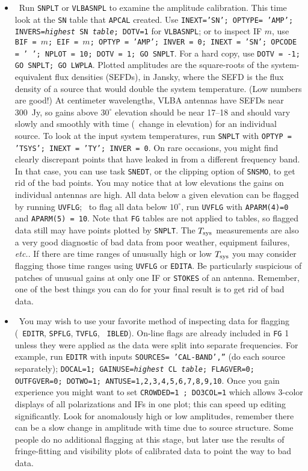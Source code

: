 \begin{enumerate}
\begin{itemize}
\item\ {Run {\tt SNPLT} or {\tt VLBASNPL} to examine the amplitude
calibration.  This time look at the {\tt SN} table that {\tt APCAL}
created.  Use {\tt INEXT='SN'; OPTYPE= 'AMP'; INVERS={\it highest} SN
{\it table}; DOTV=1} for {\tt VLBASNPL}; or to inspect IF $m$, use
{\tt BIF = $m$; EIF = $m$; OPTYP = 'AMP'; INVER = 0; INEXT = 'SN';
  OPCODE = '~'; NPLOT = 10; DOTV = 1; GO SNPLT}\@.  For a hard copy,
use {\tt DOTV = -1; GO SNPLT; GO LWPLA}\@.  Plotted amplitudes are the
square-roots of the system-equivalent flux densities (SEFDs), in
Jansky, where the SEFD is the flux density of a source that would
double the system temperature. (Low numbers are good!)  At centimeter
wavelengths, VLBA antennas have SEFDs near 300~Jy, so gains above
$30^\circ$ elevation should be near 17--18 and should vary slowly and
smoothly with time (\ie\ change in elevation) for an individual
source.  To look at the input system temperatures, run {\tt SNPLT}
with {\tt OPTYP = 'TSYS'; INEXT = 'TY'; INVER = 0}\@.  On rare
occasions, you might find clearly discrepant points that have leaked
in from a different frequency band. In that case, you can use task
{\tt SNEDT}, or the clipping option of {\tt SNSMO}, to get rid of the
bad points.  You may notice that at low elevations the gains on
individual antennas are high.  All data below a given elevation can be
flagged by running {\tt UVFLG};  \eg\ to flag all data below
$10^\circ$, run {\tt UVFLG} with {\tt APARM(4)=0} and {\tt APARM(5) =
10}\@.  Note that {\tt FG} tables are not applied to tables, so
flagged data still may have points plotted by {\tt SNPLT}\@.  The
$T_{\rm sys}$ measurements are also a very good diagnostic of bad data
from poor weather, equipment failures, {\it etc.}.  If there are time
ranges of unusually high or low $T_{\rm sys}$ you may consider
flagging those time ranges using {\tt UVFLG} or {\tt EDITA}\@.  Be
particularly suspicious of patches of unusual gains at only one IF or
{\tt STOKES} of an antenna.  Remember, one of the best things you can
do for your final result is to get rid of bad data.}

\item\ {You may wish to use your favorite method of inspecting data
for flagging (\eg\ {\tt EDITR}, {\tt SPFLG}, {\tt TVFLG}, {\tt
  IBLED})\@.  On-line flags are already included in {\tt FG} 1 unless
they were applied as the data were split into separate frequencies.
For example, run {\tt EDITR} with inputs {\tt SOURCES= 'CAL-BAND',''}
(do each source separately); {\tt DOCAL=1; GAINUSE={\it highest} CL
  {\it table}; FLAGVER=0; OUTFGVER=0; DOTWO=1;
  ANTUSE=1,2,3,4,5,6,7,8,9,10}\@.  Once you gain experience you might
want to set {\tt CROWDED=1 ; DO3COL=1} which allows 3-color displays
of all polarizations and IFs in one plot; this can speed up editing
significantly.  Look for anomalously high or low amplitudes, remember
there can be a slow change in amplitude with time due to source
structure.  Some people do no additional flagging at this stage, but
later use the results of fringe-fitting and visibility plots of
calibrated data to point the way to bad
data.}
\end{itemize}


\end{enumerate}
